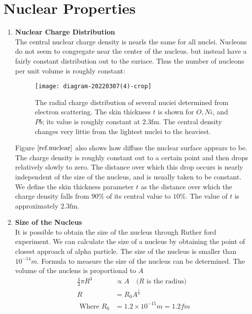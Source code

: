 \section{Nuclear Properties}
\begin{enumerate}
	\item \textbf{Nuclear Charge Distribution}\\
 The central nuclear charge density is nearls the same for all nuclei. Nucleons do not seem to congregate near the center of the nucleus. but instead have a fairly constant distribution out to the suriace. Thus the number of nucleons per unit volume is roughly constant:\\
\begin{figure}[H]
	\centering
	\texttt{[image: diagram-20220307(4)-crop]}
	\caption{ The radial charge distribution of several nuciei determined from electron scattering. The skin thickness $t$ is shown for $O, N i$, and $P b$; its value is roughly constant at $2.3 \mathrm{fm}$. The central density changes very littie from the lightest nuclei to the heaviest.}
	\label{ref.nuclear}
\end{figure}
 Figure $\ref{ref.nuclear}$ also shows how diffuse the nuclear surface appears to be. The charge density is roughly constant out to a certain point and then drops relatively slowly to zero. The distance over which this drop occurs is nearly independent of the size of the nucleus, and is usually taken to be constant. We define the skin thickness parameter $t$ as the distance over which the charge density falls from $90 \%$ of its central value to $10 \%$. The value of $t$ is approximately $2.3 \mathrm{fm}$.
	\item \textbf{Size of the Nucleus}\\
It is possible to obtain the size of the nucleus through Ruther ford experiment. We can calculate the size of a nucleus by obtaining the point of closest approach of alpha particle. The size of the nucleus is smaller than $10^{-14}m$. Formula to measure the size of the nucleus can be determined. The volume of the nuclens is proportional to  $A$ \\
\begin{align*}
\frac{4}{3}\pi R^3&\propto A\quad\text{($R$ is the radius) }\\
R&=R_0 A^\frac{1}{3}\\
\text{ Where }R_0&= 1.2\times 10^{-15}m=1.2 fm
\end{align*}
\\

\end{enumerate}
